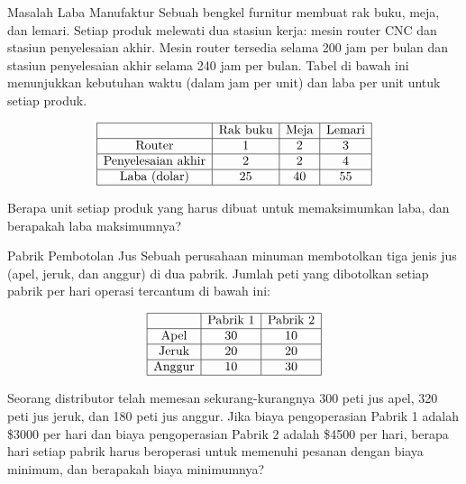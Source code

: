 \begin{ex}{Masalah Laba Manufaktur}{}
\label{ex:two-machine-profit}
 Sebuah bengkel furnitur membuat rak buku, meja, dan lemari. Setiap produk melewati dua stasiun kerja: mesin router CNC dan stasiun penyelesaian akhir. Mesin router tersedia selama 200 jam per bulan dan stasiun penyelesaian akhir selama 240 jam per bulan. Tabel di bawah ini menunjukkan kebutuhan waktu (dalam jam per unit) dan laba per unit untuk setiap produk.

\[
\begin{array}{|c|c|c|c|}
\hline
 & \text{Rak buku} & \text{Meja} & \text{Lemari} \\
\hline
\text{Router} & 1 & 2 & 3 \\
\hline
\text{Penyelesaian akhir} & 2 & 2 & 4 \\
\hline
\text{Laba (dolar)} & 25 & 40 & 55 \\
\hline
\end{array}
\]
\par{}\label{tab:modeling-linear-programming-tab07}%


Berapa unit setiap produk yang harus dibuat untuk memaksimumkan laba, dan berapakah laba maksimumnya?
\end{ex}

\begin{ex}{Pabrik Pembotolan Jus}{}
\label{ex:factory-days}
 Sebuah perusahaan minuman membotolkan tiga jenis jus (apel, jeruk, dan anggur) di dua pabrik. Jumlah peti yang dibotolkan setiap pabrik per hari operasi tercantum di bawah ini:

\[
\begin{array}{|c|c|c|}
\hline
 & \text{Pabrik 1} & \text{Pabrik 2} \\
\hline
\text{Apel} & 30 & 10 \\
\hline
\text{Jeruk} & 20 & 20 \\
\hline
\text{Anggur} & 10 & 30 \\
\hline
\end{array}
\]
\par{}\label{tab:modeling-linear-programming-tab08}%


Seorang distributor telah memesan sekurang-kurangnya 300 peti jus apel, 320 peti jus jeruk, dan 180 peti jus anggur. Jika biaya pengoperasian Pabrik 1 adalah \$3000 per hari dan biaya pengoperasian Pabrik 2 adalah \$4500 per hari, berapa hari setiap pabrik harus beroperasi untuk memenuhi pesanan dengan biaya minimum, dan berapakah biaya minimumnya?
\end{ex}

